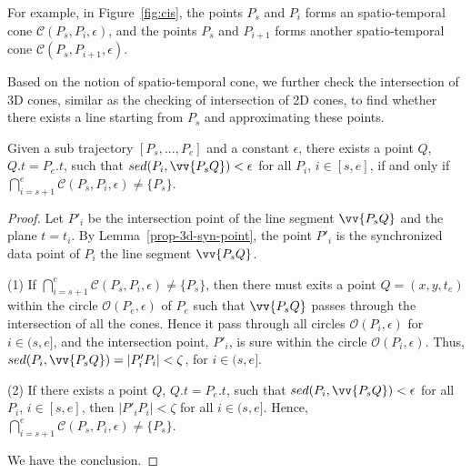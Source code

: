 For example, in Figure~\ref{fig:cis}, the points $P_s$ and $P_i$ forms an spatio-temporal cone $\mathcal{C}(P_s, P_i, \epsilon)$, and the points $P_s$ and $P_{i+1}$ forms another spatio-temporal cone $\mathcal{C}(P_s, P_{i+1}, \epsilon)$.

Based on the notion of spatio-temporal cone, we further check the intersection of 3D cones, similar as the checking of intersection of 2D cones, to find whether there exists a line starting from $P_s$ and approximating these points.

\begin{theorem}
\label{prop-3d-ci}
Given a sub trajectory $[P_s,...,P_e]$ and a constant $\epsilon$, there exists a point $Q$, $Q.t = P_e.t$, such that $sed(P_i, \vv{P_sQ})<\epsilon$ for all $P_i$, $i \in [s,e]$, if and only if $\bigcap_{i=s+1}^{e}{\mathcal{C}(P_s, P_i, \epsilon)} \ne \{P_s\}$.
\end{theorem}

\begin{proof}
Let $P'_i$ be the intersection point of the line segment $\vv{P_sQ}$ and the plane $t=t_i$.
By Lemma~\ref{prop-3d-syn-point}, the point $P'_i$ is the synchronized data point of $P_i$ \wrt the line segment $\vv{P_sQ}$.

\ni (1) If $\bigcap_{i=s+1}^{e}{\mathcal{C}(P_s, P_i, \epsilon)} \ne \{P_s\}$, then there must exits a point $Q = (x,y,t_e)$ within the circle $\mathcal{O}(P_e, \epsilon)$ of $P_e$ such that $\vv{P_sQ}$ passes through the intersection of all the cones. Hence it pass through all circles $\mathcal{O}(P_i, \epsilon)$ for $i \in (s, e]$, and the intersection point, $P'_i$, is sure within the circle $\mathcal{O}(P_i, \epsilon)$. Thus, $sed(P_i, \vv{P_sQ}) = |P'_iP_i| < \zeta$, for $i \in (s, e]$.

\ni (2) If there exists a point $Q$, $Q.t = P_e.t$, such that $sed(P_i, \vv{P_sQ})<\epsilon$ for all $P_i$, $i \in [s,e]$, then $|P'_iP_i| < \zeta$ for all $i \in (s, e]$. Hence, $\bigcap_{i=s+1}^{e}{\mathcal{C}(P_s, P_i, \epsilon)} \ne \{P_s\}$.

We have the conclusion.
\end{proof}


